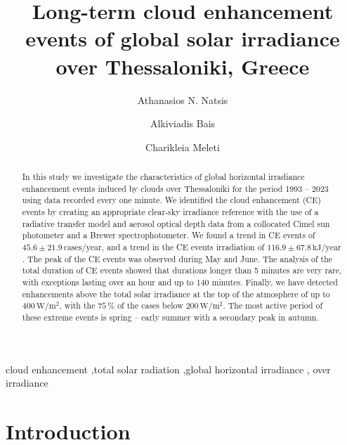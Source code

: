 \documentclass[preprint, 5p,
authoryear]{elsarticle} %
\begin{document}
\begin{frontmatter}

  \title{Long-term cloud enhancement events of global solar irradiance
over Thessaloniki, Greece}
    \author[LAP]{Athanasios N. Natsis%
  }
    \author[LAP]{Alkiviadis Bais%
  }
    \author[LAP]{Charikleia Meleti%
  }
  
  \begin{abstract}
  In this study we investigate the characteristics of global horizontal
  irradiance enhancement events induced by clouds over Thessaloniki for
  the period 1993 -- 2023 using data recorded every one minute. We
  identified the cloud enhancement (CE) events by creating an
  appropriate clear-sky irradiance reference with the use of a radiative
  transfer model and aerosol optical depth data from a collocated Cimel
  sun photometer and a Brewer spectrophotometer. We found a trend in CE
  events of \(45.6\pm 21.9\,\text{cases}/\text{year}\), and a trend in
  the CE events irradiation of \(116.9\pm 67.8\,\text{kJ}/\text{year}\).
  The peak of the CE events was observed during May and June. The
  analysis of the total duration of CE events showed that durations
  longer than 5 minutes are very rare, with exceptions lasting over an
  hour and up to 140 minutes. Finally, we have detected enhancements
  above the total solar irradiance at the top of the atmosphere of up to
  \(400\,\text{W}/\text{m}^{2}\), with the \(75\,\%\) of the cases below
  \(200\,\text{W}/\text{m}^{2}\). The most active period of these
  extreme events is spring -- early summer with a secondary peak in
  autumn.
  \end{abstract}
    \begin{keyword}
    cloud enhancement \sep total solar radiation \sep global horizontal
irradiance \sep 
    over irradiance
  \end{keyword}
  
 \end{frontmatter}

\hypertarget{introduction}{%
\section{Introduction}\label{introduction}}
\end{document}
